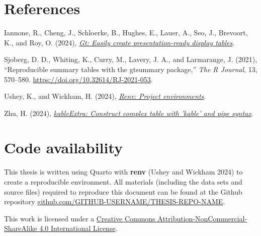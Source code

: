 \documentclass[
  11pt,
  letterpaper,
  twoside]{report}
\newlength{\cslhangindent}
\newenvironment{CSLReferences}[2] %
 {\begin{list}{}{%
  \setlength{\itemindent}{0pt}
  \setlength{\leftmargin}{0pt}
  \setlength{\parsep}{0pt}
  \ifodd #1
   \setlength{\leftmargin}{\cslhangindent}
   \setlength{\itemindent}{-1\cslhangindent}
  \fi
  \setlength{\itemsep}{#2\baselineskip}}}
 {\end{list}}
\begin{document}

\chapter*{References}\label{references}


\label{refs}
\begin{CSLReferences}{1}{0}
Iannone, R., Cheng, J., Schloerke, B., Hughes, E., Lauer, A., Seo, J.,
Brevoort, K., and Roy, O. (2024),
\emph{\href{https://gt.rstudio.com}{Gt: Easily create presentation-ready
display tables}}.

Sjoberg, D. D., Whiting, K., Curry, M., Lavery, J. A., and Larmarange,
J. (2021), {``Reproducible summary tables with the gtsummary package,''}
\emph{{The R Journal}}, 13, 570--580.
\url{https://doi.org/10.32614/RJ-2021-053}.

Ushey, K., and Wickham, H. (2024),
\emph{\href{https://rstudio.github.io/renv/}{Renv: Project
environments}}.

Zhu, H. (2024),
\emph{\href{https://CRAN.R-project.org/package=kableExtra}{kableExtra:
Construct complex table with 'kable' and pipe syntax}}.

\end{CSLReferences}

\cleardoublepage
{}
{}
\appendix

\chapter{Code availability}\label{sec-code}

This thesis is written using Quarto with \textbf{renv} (Ushey and
Wickham 2024) to create a reproducible environment. All materials
(including the data sets and source files) required to reproduce this
document can be found at the Github repository
\href{https://github.com/github-username/thesis-repo-name}{github.com/GITHUB-USERNAME/THESIS-REPO-NAME}.

This work is licensed under a
\href{http://creativecommons.org/licenses/by-nc-sa/4.0/}{Creative
Commons Attribution-NonCommercial-ShareAlike 4.0 International License}.
\end{document}
